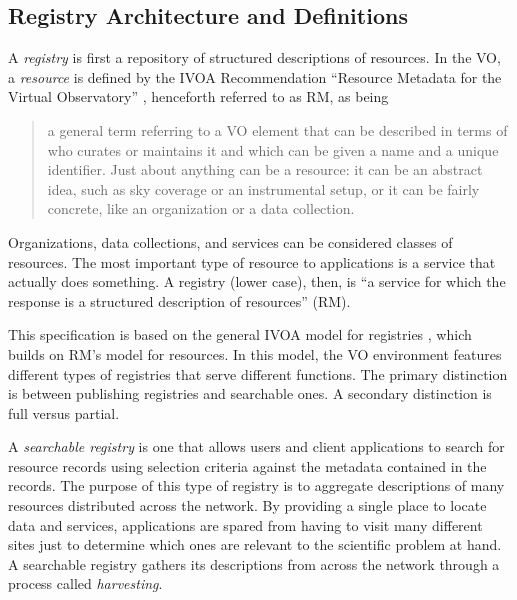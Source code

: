 \documentclass{ivoa}
\begin{document}
\subsection{Registry Architecture and Definitions}

\label{arch}

A \emph{registry} is first a repository of structured descriptions of
resources. In the VO, a \emph{resource} is defined by the IVOA
Recommendation ``Resource Metadata for the Virtual Observatory''
\citep{std:RM}, henceforth referred to as RM, as being


\begin{quotation}
a general term referring to a VO element that can be
described in terms of who curates or maintains it and which can be
given a name and a unique identifier. Just about anything can be a
resource: it can be an abstract idea, such as sky coverage or an
instrumental setup, or it can be fairly concrete, like an organization
or a data collection.
\end{quotation}

Organizations, data collections, and services can be considered 
classes of resources. The most important type of resource to
applications is a service that actually does something. A registry
(lower case),
then, is ``a service for which the response is a structured description
of resources'' (RM).

This specification is based on the general IVOA model for registries
\citep{2004ASPC..314..585P}, which builds on RM's model
for resources.  In this model, the VO environment features
different types of registries that serve different functions. The
primary distinction is between publishing registries and searchable
ones. A secondary distinction is full versus partial.

A \emph{searchable registry} is one that allows users and client
applications to search for resource records using selection criteria
against the metadata contained in the records. The purpose of this type
of registry is to aggregate descriptions of many resources distributed
across the network. By providing a single place to locate data and
services, applications are spared from having to visit many different
sites just to determine which ones are relevant to the scientific
problem at hand. A searchable registry gathers its descriptions from
across the network through a process called \emph{harvesting}.
\end{document}
